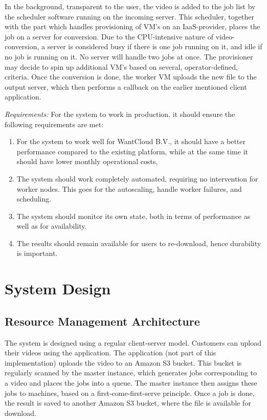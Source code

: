 \documentclass[a4paper]{IEEEtran}
\begin{document}
In the background, transparent to the user, the video is added to the job list by the scheduler software running on the incoming server.
This scheduler, together with the part which handles provisioning of VM's on an IaaS-provider, places the job on a server for conversion.
Due to the CPU-intensive nature of video-conversion, a server is considered busy if there is one job running on it, and idle if no job is running on it. 
No server will handle two jobs at once.
The provisioner may decide to spin up additional VM's based on several, operator-defined, criteria.
Once the conversion is done, the worker VM uploads the new file to the output server, which then performs a callback on the earlier mentioned client application.

\textit{Requirements:} For the system to work in production, it should ensure the following requirements are met:

\begin{enumerate}
\item For the system to work well for WantCloud B.V., it should have a better performance compared to the existing platform, while at the same time it should have lower monthly operational costs,
\item The system should work completely automated, requiring no intervention for worker nodes. This goes for the autoscaling, handle worker failures, and scheduling.
\item The system should monitor its own state, both in terms of performance as well as for availability.
\item The results should remain available for users to re-download, hence durability is important.
\end{enumerate}


\section{System Design}

\subsection{Resource Management Architecture}

The system is designed using a regular client-server model.
Customers can upload their videos using the application.
The application (not part of this implementation) uploads the video to an Amazon S3 bucket.
This bucket is regularly scanned by the master instance, which generates jobs corresponding to a video and places the jobs into a queue.
The master instance then assigns these jobs to machines, based on a first-come-first-serve principle.
Once a job is done, the result is saved to another Amazon S3 bucket, where the file is available for download.
\end{document}
